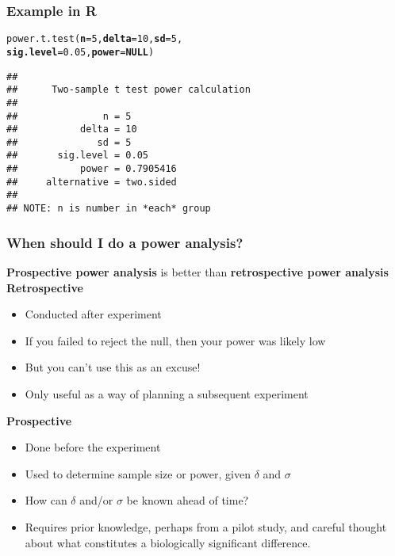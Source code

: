 \documentclass[color=usenames,dvipsnames]{beamer}\usepackage[]{graphicx}\usepackage[]{color}
\makeatletter
\newcommand{\hlnum}[1]{\textcolor[rgb]{0.69,0.494,0}{#1}}%
\newcommand{\hlstd}[1]{\textcolor[rgb]{0,0,0}{#1}}%
\newcommand{\hlkwa}[1]{\textcolor[rgb]{0,0,0}{\textbf{#1}}}%
\newcommand{\hlkwc}[1]{\textcolor[rgb]{0,0,0}{\textbf{#1}}}%
\newcommand{\hlkwd}[1]{\textcolor[rgb]{0.004,0.004,0.506}{#1}}%
\newenvironment{kframe}{%
 \def\at@end@of@kframe{}%
 \ifinner\ifhmode%
  \def\at@end@of@kframe{\end{minipage}}%
  \begin{minipage}{\columnwidth}%
 \fi\fi%
 \def\FrameCommand##1{\hskip\@totalleftmargin \hskip-\fboxsep
 \colorbox{shadecolor}{##1}\hskip-\fboxsep
     \hskip-\linewidth \hskip-\@totalleftmargin \hskip\columnwidth}%
 \MakeFramed {\advance\hsize-\width
   \@totalleftmargin\z@ \linewidth\hsize
   \@setminipage}}%
 {\par\unskip\endMakeFramed%
 \at@end@of@kframe}
\newenvironment{knitrout}{}{} %
\makeatother
\begin{document}
\begin{frame}[fragile]
  \frametitle{Example in {\bf R}}
  \small
\begin{knitrout}
\color{fgcolor}\begin{kframe}
\begin{alltt}
\hlkwd{power.t.test}\hlstd{(}\hlkwc{n}\hlstd{=}\hlnum{5}\hlstd{,} \hlkwc{delta}\hlstd{=}\hlnum{10}\hlstd{,} \hlkwc{sd}\hlstd{=}\hlnum{5}\hlstd{,}
             \hlkwc{sig.level}\hlstd{=}\hlnum{0.05}\hlstd{,} \hlkwc{power}\hlstd{=}\hlkwa{NULL}\hlstd{)}
\end{alltt}
\begin{verbatim}
## 
##      Two-sample t test power calculation 
## 
##               n = 5
##           delta = 10
##              sd = 5
##       sig.level = 0.05
##           power = 0.7905416
##     alternative = two.sided
## 
## NOTE: n is number in *each* group
\end{verbatim}
\end{kframe}
\end{knitrout}
\end{frame}









\begin{frame}
  \frametitle{When should I do a power analysis?}
  {%
    \centering \large
    \alert{\bf Prospective power analysis} is better than
    \alert{\bf retrospective power analysis} \\}
  \pause
  \vfill
  {\bf
    Retrospective}
  \begin{itemize}
    \item Conducted after experiment
    \item If you failed to reject the null, then your power was likely low
    \item But you can't use this as an excuse!
    \item Only useful as a way of planning a subsequent experiment
  \end{itemize}
  \pause
  \vfill
  {\bf
    Prospective}
  \begin{itemize}
    \item Done before the experiment
    \item Used to determine sample size or power, given $\delta$ and $\sigma$
    \item How can $\delta$ and/or $\sigma$ be known ahead of time?
    \item Requires prior knowledge, perhaps from a pilot study, and
      careful thought about what constitutes a biologically significant
      difference. 
  \end{itemize}
\end{frame}
\end{document}
